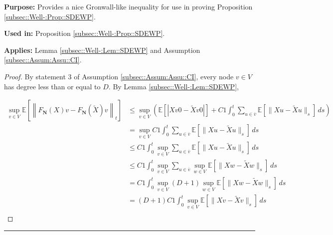 \documentclass[12pt]{article}
\newcommand{\mb}{\mathbb}
\newcommand{\ov}{\overline}
\newcommand{\purpose}{\textbf{Purpose: }}
\newcommand{\usein}{\textbf{Used in: }}
\newcommand{\app}{\textbf{Applies: }}
\newcommand{\lin}{\rule{\linewidth}{0.4 pt}}
\newcommand{\ex}[1]{\mb{E}\left[#1\right]}			%
\renewcommand{\v}{v}							%
\newcommand{\vv}{u}								%
\newcommand{\vvv}{w}							%
\renewcommand{\t}{t}							%
\renewcommand{\tt}{s}							%
\newcommand{\X}{X}								%
\newcommand{\cl}{\ov}							%
\newcommand{\const}{C}							%
\newcommand{\degr}{D}							%
\newcommand{\poisses}{\mathbf{N}}				%
\newcommand{\Fpo}{F_{\poisses}}					%
\newcommand{\alt}[1]{\widetilde{#1}}			%
\begin{document}
\purpose Provides a nice Gronwall-like inequality for use in proving Proposition \ref{subsec::Well-:Prop::SDEWP}.

\usein Proposition \ref{subsec::Well-:Prop::SDEWP}.

\app Lemma \ref{subsec::Well-:Lem::SDEWP} and Assumption \ref{subsec::Assum:Assu::CI}.

\begin{proof}
By statement 3 of Assumption \ref{subsec::Assum:Assu::CI}, every node \(v \in V\) has degree less than or equal to \(\degr\). By Lemma \ref{subsec::Well-:Lem::SDEWP},

\begin{align*}
\sup_{\v \in V} \ex{\left\|\Fpo(\X{}{}){\v} - \Fpo(\alt{\X}{}{}){\v}\right\|_\t} &\leq \sup_{\v\in V}\left(\ex{|\X{\v}{0} - \alt{\X}{\v}{0}|} +  \const{1}\int_0^\t \sum_{\vv\in \cl{\v}} \ex{\|\X{\vv}{} - \alt{\X}{\vv}{}\|_\tt}\,d\tt\right)\\
&=\sup_{\v \in V} \const{1}\int_0^\t \sum_{\vv \in \cl{\v}} \ex{\|\X{\vv}{} - \alt{\X}{\vv}{}\|_\tt}\,d\tt\\
&\leq \const{1}\int_0^\t \sup_{\v \in V}\sum_{\vv \in \cl{\v}} \ex{\|\X{\vv}{} - \alt{\X}{\vv}{}\|_\tt}\,d\tt\\
&\leq \const{1}\int_0^\t \sup_{\v \in V}\sum_{\vv \in \cl{\v}}\sup_{\vvv\in V} \ex{\|\X{\vvv}{} - \alt{\X}{\vvv}{}\|_\tt}\,d\tt\\
&= \const{1}\int_0^\t \sup_{\v \in V}(\degr+1)\sup_{\vvv\in V} \ex{\|\X{\vvv}{} - \alt{\X}{\vvv}{}\|_\tt}\,d\tt\\
&= (\degr+1)\const{1}\int_0^\t \sup_{\v\in V} \ex{\|\X{\v}{} - \alt{\X}{\v}{}\|_\tt}\,d\tt\\
\end{align*}
\end{proof}
\lin
\end{document}
